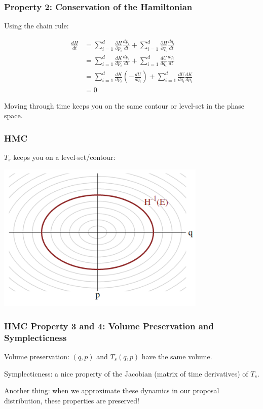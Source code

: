 \documentclass{beamer}
\begin{document}
\begin{frame}
\frametitle{Property 2: Conservation of the Hamiltonian}

Using the chain rule:

\begin{align*}
\frac{d H}{dt} &= \sum_{i=1}^d \frac{\partial H}{\partial p_i}\frac{dp_i}{dt} + \sum_{i=1}^d \frac{\partial H}{\partial q_i}\frac{dq_i}{dt} \\
&= \sum_{i=1}^d \frac{dK}{dp_i}\frac{dp_i}{dt} + \sum_{i=1}^d \frac{dU}{dq_i}\frac{dq_i}{dt} \\
&= \sum_{i=1}^d \frac{dK}{dp_i}\left( - \frac{d U}{dq_i}\right) + \sum_{i=1}^d \frac{dU}{dq_i}\frac{dK}{dp_i} \\
&= 0
\end{align*}

Moving through time keeps you on the same contour or level-set in the phase space.
\end{frame}

\begin{frame}
\frametitle{HMC}

$T_s$ keeps you on a level-set/contour: 
\begin{center}
\includegraphics[width=100mm]{level_sets.png}
\end{center}
\end{frame}

\begin{frame}
\frametitle{HMC Property 3 and 4: Volume Preservation and Symplecticness}

Volume preservation: $(q,p)$ and $T_s(q,p)$ have the same volume.
\newline

Symplecticness: a nice property of the Jacobian (matrix of time derivatives) of $T_s$.
\newline

Another thing: when we approximate these dynamics in our proposal distribution, these properties are preserved!




\end{frame}
\end{document}
